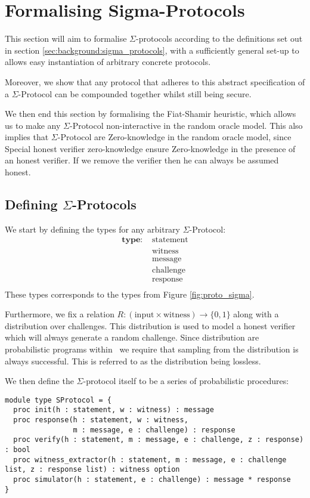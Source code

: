 \chapter{Formalising Sigma-Protocols}
\label{ch:formal_sigma}
This section will aim to formalise $\Sigma$-protocols according to the
definitions set out in section \ref{sec:background:sigma_protocols}, with a
sufficiently general set-up to allows easy instantiation of arbitrary concrete
protocols.

Moreover, we show that any protocol that adheres to this abstract specification
of a $\Sigma$-Protocol can be compounded together whilst still being secure.

We then end this section by formalising the Fiat-Shamir heuristic, which allows
us to make any $\Sigma$-Protocol non-interactive in the random oracle model.
This also implies that $\Sigma$-Protocol are Zero-knowledge in the random oracle
model, since Special honest verifier zero-knowledge ensure Zero-knowledge in the
presence of an honest verifier. If we remove the verifier then he can always be
assumed honest.

\section{Defining $\Sigma$-Protocols}
\label{sec:sigma:def}
We start by defining the types for any arbitrary $\Sigma$-Protocol:
\begin{align*}
  \textbf{type: } &\text{statement} \\
                  &\text{witness} \\
                  &\text{message} \\
                  &\text{challenge} \\
                  &\text{response} \\
\end{align*}
These types corresponds to the types from Figure \ref{fig:proto_sigma}.

Furthermore, we fix a relation
$R : (\text{input} \times \text{witness}) \rightarrow \{0,1\}$ along with
a distribution over challenges. This distribution is used to model a honest
verifier which will always generate a random challenge. Since distribution are
probabilistic programs within \easycrypt\ we require that sampling from the
distribution is always successful. This is referred to as the distribution being lossless.

We then define the $\Sigma$-protocol itself to be a series of probabilistic procedures:
\begin{lstlisting}[label=lst:sigma_procedures,caption= Abstract procedures of $\Sigma$-Protocols]
module type SProtocol = {
  proc init(h : statement, w : witness) : message
  proc response(h : statement, w : witness,
                m : message, e : challenge) : response
  proc verify(h : statement, m : message, e : challenge, z : response) : bool
  proc witness_extractor(h : statement, m : message, e : challenge list, z : response list) : witness option
  proc simulator(h : statement, e : challenge) : message * response
}
\end{lstlisting}

